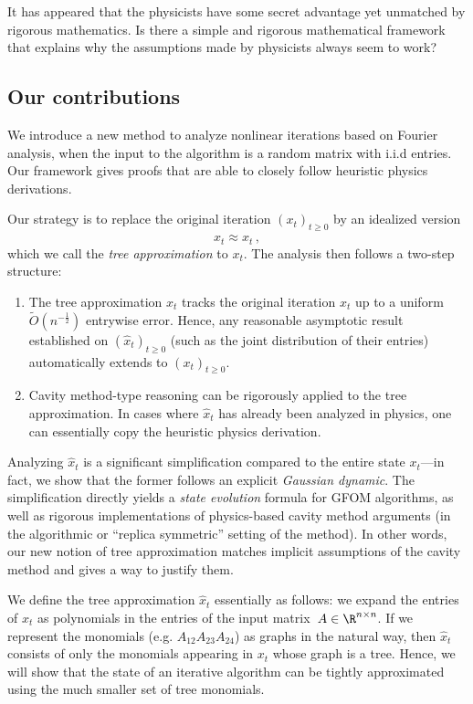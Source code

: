\documentclass[12pt]{article}
\begin{document}
It has appeared that the physicists have some secret advantage yet unmatched by rigorous mathematics.
Is there a simple and rigorous mathematical framework that explains why the assumptions made by physicists always seem to work?


\subsection{Our contributions}


We introduce a new method to analyze nonlinear iterations based on Fourier analysis, when the input to the algorithm is a random matrix with i.i.d entries. Our framework
gives proofs that are able to
closely follow heuristic physics derivations.

Our strategy is to replace the original iteration $(x_t)_{t \geq 0}$
by an idealized version
\[x_t \approx \widehat x_t\,,\]
which we call the \emph{tree approximation} to $x_t$.
The analysis then follows a
two-step structure:
\begin{enumerate}
    \item The tree approximation $\widehat x_t$ tracks the original
    iteration $x_t$ up to a uniform $\widetilde{O}(n^{-\frac 1 2})$ entrywise error.
    Hence, any reasonable asymptotic
    result established on
    $(\widehat x_t)_{t\ge 0}$ (such as the joint distribution of their entries) automatically extends to $(x_t)_{t\ge 0}$.
    \item Cavity method-type reasoning can be 
    rigorously applied to the
    tree approximation. 
    In cases where $\widehat x_t$ has already been analyzed in physics,
    one can essentially copy
    the heuristic physics derivation. 
\end{enumerate}

Analyzing $\widehat x_t$ is a
significant simplification compared to the entire state $x_t$---in fact, we show 
that the former follows an explicit {\em Gaussian dynamic}.
The simplification directly yields
a \emph{state evolution} formula for GFOM algorithms,
as well as rigorous
implementations of physics-based cavity method arguments (in the algorithmic or ``replica symmetric'' setting of the method).
In other words, our new notion of tree
approximation matches implicit assumptions
of the cavity method and gives a way to
justify them.


We define the tree approximation $\widehat x_t$ essentially as follows: we expand
the entries of $x_t$ as polynomials in the entries of the
input matrix~$A \in \R^{n \times n}$.
If we represent the monomials 
(e.g. $A_{12}A_{23}A_{24}$) as graphs in the natural way, then $\widehat x_t$
consists of only the monomials appearing in $x_t$ whose graph is a tree. 
Hence, we will show that the state of an
iterative algorithm can be tightly approximated using the much smaller set of tree monomials.
\end{document}
